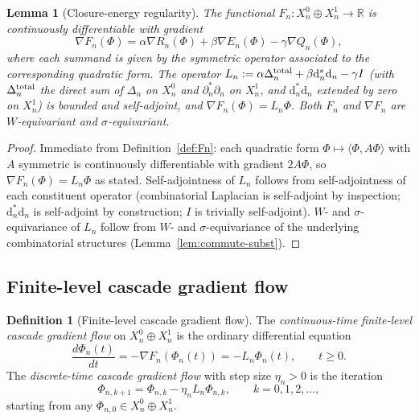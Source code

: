 \documentclass[11pt, a4paper]{amsart}
\newtheorem{lemma}[theorem]{Lemma}
\theoremstyle{definition}
\newtheorem{definition}[theorem]{Definition}
\newcommand{\R}{\mathbb{R}}
\begin{document}
\begin{lemma}[Closure-energy regularity]
\label{lem:Fn-regularity}
The functional $F_n \colon X_n^0 \oplus X_n^1 \to \R$ is
continuously differentiable with gradient
\[
  \nabla F_n(\Phi) = \alpha \nabla R_n(\Phi) + \beta \nabla E_n(\Phi)
    - \gamma \nabla Q_n(\Phi),
\]
where each summand is given by the symmetric operator associated
to the corresponding quadratic form. The operator
$L_n := \alpha \Delta_n^{\rm total} + \beta
\mathrm{d}_n^* \mathrm{d}_n - \gamma I$
(with $\Delta_n^{\rm total}$ the direct sum of $\Delta_n$ on
$X_n^0$ and $\partial_n^* \partial_n$ on $X_n^1$, and
$\mathrm{d}_n^* \mathrm{d}_n$ extended by zero on $X_n^1$) is
bounded and self-adjoint, and $\nabla F_n(\Phi) = L_n \Phi$. Both
$F_n$ and $\nabla F_n$ are $W$-equivariant and
$\sigma$-equivariant.
\end{lemma}

\begin{proof}
Immediate from Definition~\ref{def:Fn}: each quadratic form
$\Phi \mapsto \langle \Phi, A\Phi \rangle$ with $A$ symmetric is
continuously differentiable with gradient $2 A\Phi$, so
$\nabla F_n(\Phi) = L_n \Phi$ as stated. Self-adjointness of $L_n$
follows from self-adjointness of each constituent operator
(combinatorial Laplacian is self-adjoint by inspection;
$\mathrm{d}_n^*\mathrm{d}_n$ is self-adjoint by construction;
$I$ is trivially self-adjoint). $W$- and $\sigma$-equivariance of
$L_n$ follow from $W$- and $\sigma$-equivariance of the
underlying combinatorial structures (Lemma~\ref{lem:commute-subst}).
\end{proof}

\subsection{Finite-level cascade gradient flow}
\label{subsec:gradient-flow}

\begin{definition}[Finite-level cascade gradient flow]
\label{def:gradient-flow}
The \emph{continuous-time finite-level cascade gradient flow} on
$X_n^0 \oplus X_n^1$ is the ordinary differential equation
\begin{equation}
\label{eq:flow}
  \frac{d \Phi_n(t)}{dt} = -\nabla F_n(\Phi_n(t))
  = -L_n \Phi_n(t), \qquad t \geq 0.
\end{equation}
The \emph{discrete-time cascade gradient flow} with step size
$\eta_n > 0$ is the iteration
\begin{equation}
\label{eq:flow-discrete}
  \Phi_{n, k+1} = \Phi_{n, k} - \eta_n L_n \Phi_{n, k},
  \qquad k = 0, 1, 2, \ldots,
\end{equation}
starting from any $\Phi_{n, 0} \in X_n^0 \oplus X_n^1$.
\end{definition}
\end{document}
